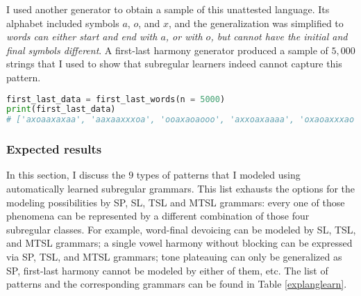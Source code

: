 I used another generator to obtain a sample of this unattested language.
Its alphabet included symbols $a$, $o$, and $x$, and the generalization was simplified to \emph{words can either start and end with $a$, or with $o$, but cannot have the initial and final symbols different}.
A first-last harmony generator produced a sample of $5,000$ strings that I used to show that subregular learners indeed cannot capture this pattern.


\begin{lstlisting}[language=Python]
first_last_data = first_last_words(n = 5000)
print(first_last_data)
# ['axoaaxaxaa', 'aaxaaxxxoa', 'ooaxaoaooo', 'axxoaxaaaa', 'oxaoaxxxao', ...]
\end{lstlisting}

\subsubsection{Expected results}

In this section, I discuss the $9$ types of patterns that I modeled using automatically learned subregular grammars.
This list exhausts the options for the modeling possibilities by SP, SL, TSL and MTSL grammars: every one of those phenomena can be represented by a different combination of those four subregular classes.
For example, word-final devoicing can be modeled by SL, TSL, and MTSL grammars; a single vowel harmony without blocking can be expressed via SP, TSL, and MTSL grammars; tone plateauing can only be generalized as SP, first-last harmony cannot be modeled by either of them, etc.
The list of patterns and the corresponding grammars can be found in Table \ref{explanglearn}.

